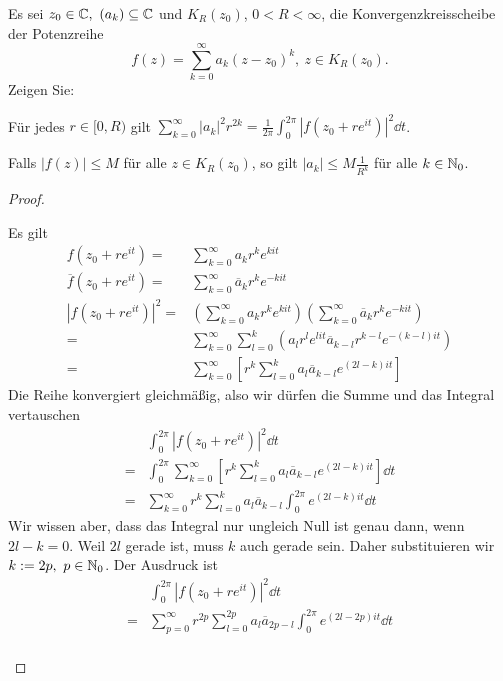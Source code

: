 \begin{Problem}
	Es sei $z_0\in \mathbb{C},~(a_k)\subseteq \mathbb{C}$ und $K_R(z_0)$, $0<R<\infty$, die Konvergenzkreisscheibe der Potenzreihe
	\[
		f(z)=\sum_{k=0}^\infty a_k(z-z_0)^k,~z\in K_R(z_0)
	.\] 
	Zeigen Sie:
	\begin{parts}
		\item F\"{u}r jedes $r\in [0,R)$ gilt $\sum_{k=0}^\infty |a_k|^2 r^{2k}=\frac{1}{2\pi}\int_0^{2\pi} |f(z_0+re^{it})|^2\dd{t}$.
		\item Falls $|f(z)|\le M$ f\"{u}r alle $z\in K_R(z_0)$, so gilt $|a_k|\le M \frac{1}{R^k}$ f\"{u}r alle $k\in \mathbb{N}_0$.
	\end{parts}
\end{Problem}

\begin{proof}
	\begin{parts}
	\item Es gilt
		\begin{align*}
			f(z_0+re^{it})=& \sum_{k=0}^\infty a_kr^k e^{kit}\\
			\overline{f}(z_0+re^{it})=&\sum_{k=0}^\infty \overline{a}_k r^k e^{-kit}\\
			|f(z_0+re^{it})|^2=&\left( \sum_{k=0}^\infty a_k r^k e^{kit}\right)\left( \sum_{k=0}^\infty \overline{a}_k r^k e^{-kit} \right)\\
			=&\sum_{k=0}^\infty\sum_{l=0}^k\left(a_l r^l e^{lit} \overline{a}_{k-l} r^{k-l}e^{-(k-l)it} \right)\\
			=&\sum_{k=0}^\infty \left[ r^k\sum_{l=0}^k a_l \overline{a}_{k-l}e^{(2l-k)it} \right] 
		\end{align*}
		Die Reihe konvergiert gleichmäßig, also wir dürfen die Summe und das Integral vertauschen
		\begin{align*}
			&\int_0^{2\pi} |f(z_0+re^{it})|^2\dd{t}\\
			=&\int_{0}^{2\pi} \sum_{k=0}^\infty \left[ r^k \sum_{l=0}^k a_l \overline{a}_{k-l} e^{(2l-k)it} \right] \dd{t}\\
			=&\sum_{k=0}^\infty r^k \sum_{l=0}^k a_l \overline{a}_{k-l} \int_0^{2\pi} e^{(2l-k)it}\dd{t}
		\end{align*}
		Wir wissen aber, dass das Integral nur ungleich Null ist genau dann, wenn $2l-k=0$. Weil $2l$ gerade ist, muss $k$ auch gerade sein. Daher substituieren wir $k:=2p,~p\in \mathbb{N}_0$. Der Ausdruck ist
		\begin{align*}
			&\int_0^{2\pi} |f(z_0+re^{it})|^2\dd{t}\\
			=& \sum_{p=0}^\infty r^{2p} \sum_{l=0}^{2p} a_l \overline{a}_{2p-l} \int_0^{2\pi} e^{(2l-2p)it}\dd{t}\\

\end{align*}
\end{parts}
\end{proof}
